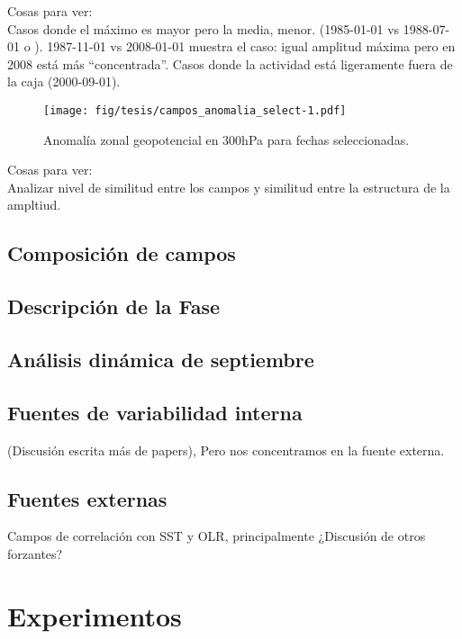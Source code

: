 \documentclass[spanish,a4paper]{book}
\begin{document}
Cosas para ver:\\
Casos donde el máximo es mayor pero la media, menor. (1985-01-01 vs
1988-07-01 o ). 1987-11-01 vs 2008-01-01 muestra el caso: igual amplitud
máxima pero en 2008 está más ``concentrada''. Casos donde la actividad
está ligeramente fuera de la caja (2000-09-01).

\begin{figure}
\centering
\texttt{[image: fig/tesis/campos\_anomalia\_select-1.pdf]}
\caption{Anomalía zonal geopotencial en 300hPa para fechas
seleccionadas.}
\end{figure}

Cosas para ver:\\
Analizar nivel de similitud entre los campos y similitud entre la
estructura de la ampltiud.

\section{Composición de campos}\label{composicion-de-campos}

\section{Descripción de la Fase}\label{descripcion-de-la-fase}

\section{Análisis dinámica de
septiembre}\label{analisis-dinamica-de-septiembre}

\section{Fuentes de variabilidad
interna}\label{fuentes-de-variabilidad-interna}

(Discusión escrita más de papers), Pero nos concentramos en la fuente
externa.

\section{Fuentes externas}\label{fuentes-externas}

Campos de correlación con SST y OLR, principalmente ¿Discusión de otros
forzantes?

\chapter{Experimentos}\label{experimentos}
\end{document}
